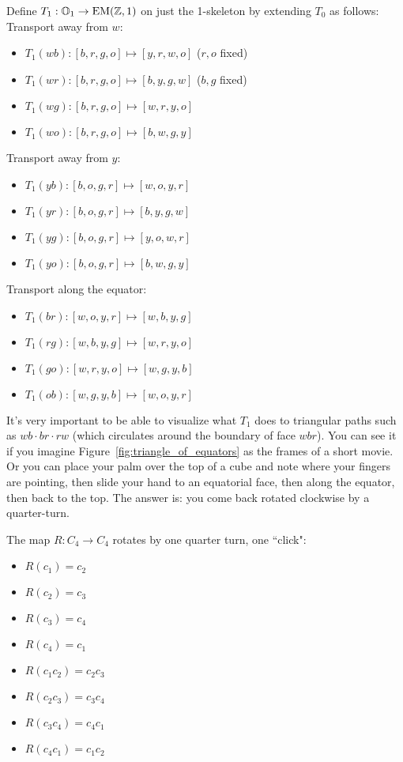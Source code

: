 \begin{mydef}
Define \( T_1:\mathbb{O}_1\to\mathrm{EM}(\mathbb{Z},1) \) on just the 1-skeleton by extending \( T_0 \) as follows:
Transport away from \( w \):
\begin{itemize}
\item \( T_1(wb):[b, r, g, o]\mapsto [y, r, w, o] \) (\( r, o \) fixed)
\item \( T_1(wr):[b, r, g, o]\mapsto [b, y, g, w] \) (\( b, g \) fixed)
\item \( T_1(wg):[b, r, g, o]\mapsto [w, r, y, o] \)
\item \( T_1(wo):[b, r, g, o]\mapsto [b, w, g, y] \)
\end{itemize}
Transport away from \( y \):
\begin{itemize}
\item \( T_1(yb):[b, o, g, r]\mapsto [w, o, y, r] \)
\item \( T_1(yr):[b, o, g, r]\mapsto [b, y, g, w] \)
\item \( T_1(yg):[b, o, g, r]\mapsto [y, o, w, r] \)
\item \( T_1(yo):[b, o, g, r]\mapsto [b, w, g, y] \)
\end{itemize}
Transport along the equator:
\begin{itemize}
\item \( T_1(br):[w, o, y, r]\mapsto [w, b, y, g] \) 
\item \( T_1(rg):[w, b, y, g]\mapsto [w, r, y, o] \)
\item \( T_1(go):[w, r, y, o]\mapsto [w, g, y, b] \)
\item \( T_1(ob):[w, g, y, b]\mapsto [w, o, y, r] \)
\end{itemize}
\end{mydef}

It's very important to be able to visualize what \( T_1 \) does to triangular paths such as \( wb\cdot br\cdot rw \) (which circulates around the boundary of face \( wbr \)). You can see it if you imagine Figure~\ref{fig:triangle_of_equators} as the frames of a short movie. Or you can place your palm over the top of a cube and note where your fingers are pointing, then slide your hand to an equatorial face, then along the equator, then back to the top. The answer is: you come back rotated clockwise by a quarter-turn. 

\begin{mydef}
The map \( R:C_4\to C_4 \) rotates by one quarter turn, one ``click":
\begin{multicols}{2}
\begin{itemize}
\item \( R(c_1) = c_2 \)
\item \( R(c_2) = c_3 \)
\item \( R(c_3) = c_4 \)
\item \( R(c_4) = c_1 \)
\item \( R(c_1c_2) = c_2c_3 \)
\item \( R(c_2c_3) = c_3c_4 \)
\item \( R(c_3c_4) = c_4c_1 \)
\item \( R(c_4c_1) = c_1c_2 \)
\end{itemize}
\end{multicols}
\end{mydef}

